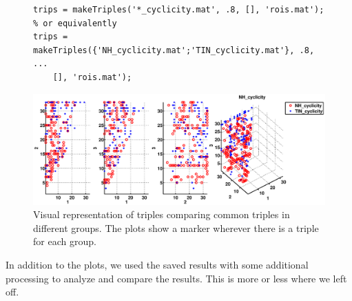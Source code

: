 \documentclass[11pt]{article}
\begin{document}
\begin{figure}
\begin{minipage}{\linewidth}
\begin{lstlisting}
trips = makeTriples('*_cyclicity.mat', .8, [], 'rois.mat'); 
% or equivalently
trips = makeTriples({'NH_cyclicity.mat';'TIN_cyclicity.mat'}, .8, ...
	[], 'rois.mat'); 	
\end{lstlisting}
\end{minipage}
\hfill
\begin{minipage}{\linewidth}
\includegraphics[width=\linewidth]{figs/makeTriples.eps}
\end{minipage}
\caption{Visual representation of triples comparing common triples in different groups. The plots show a marker wherever there is a triple for each group.}
\label{fig:makeTriples}
\end{figure}

In addition to the plots, we used the saved results with some additional processing to analyze and compare the results. This is more or less where we left off. 
\end{document}
